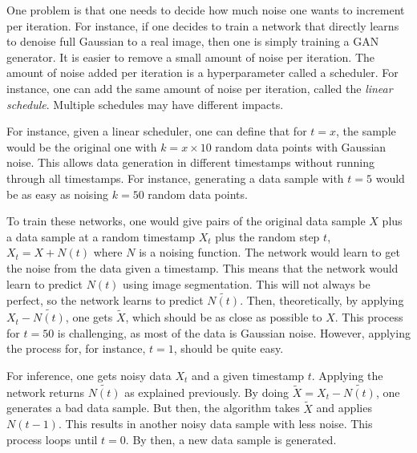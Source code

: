 One problem is that one needs to decide how much noise one wants to increment per iteration. For instance, if one decides to train a network that directly learns to denoise full Gaussian to a real image, then one is simply training a \ac{GAN} generator. It is easier to remove a small amount of noise per iteration. The amount of noise added per iteration is a hyperparameter called a scheduler. For instance, one can add the same amount of noise per iteration, called the \textit{linear schedule}. Multiple schedules may have different impacts.

For instance, given a linear scheduler, one can define that for $t = x$, the sample would be the original one with $k = x \times 10$ random data points with Gaussian noise. This allows data generation in different timestamps without running through all timestamps. For instance, generating a data sample with $t = 5$ would be as easy as noising $k = 50$ random data points.

To train these networks, one would give pairs of the original data sample $X$ plus a data sample at a random timestamp $X_t$ plus the random step $t$, $X_t = X + N(t)$ where $N$ is a noising function. The network would learn to get the noise from the data given a timestamp. This means that the network would learn to predict $N(t)$ using image segmentation. This will not always be perfect, so the network learns to predict $\tilde{N(t)}$. Then, theoretically, by applying $X_t - \tilde{N(t)}$, one gets $\tilde{X}$, which should be as close as possible to $X$. This process for $t = 50$ is challenging, as most of the data is Gaussian noise. However, applying the process for, for instance, $t = 1$, should be quite easy.

For inference, one gets noisy data $X_t$ and a given timestamp $t$. Applying the network returns $\tilde{N(t)}$ as explained previously. By doing $\tilde{X} = X_t - \tilde{N(t)}$, one generates a bad data sample. But then, the algorithm takes $\tilde{X}$ and applies $N(t - 1)$. This results in another noisy data sample with less noise. This process loops until $t = 0$. By then, a new data sample is generated.